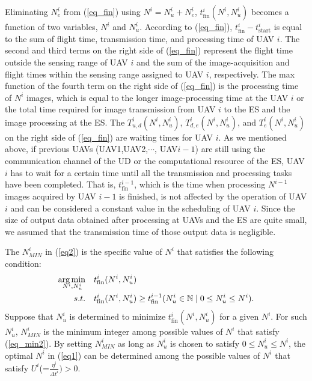 \documentclass{ieeeaccess}
\begin{document}
Eliminating $N_e^i$ from (\ref{eq_fin}) using $N^i=N_u^i+N_e^i$, $t_{\mathrm{fin}}^i(N^i,N_u^i)$ becomes a function of two variables, $N^i$ and $N_u^i$. According to (\ref{eq_fin}), $t_{\mathrm{fin}}^i-t_{\mathrm{start}}^i$ is equal to the sum of flight time, transmission time, and processing time of UAV $i$. The second and third terms on the right side of (\ref{eq_fin}) represent the flight time outside the sensing range of UAV $i$ and the sum of the image-acquisition and flight times within the sensing range assigned to UAV $i$, respectively. The max function of the fourth term on the right side of (\ref{eq_fin}) is the processing time of $N^i$ images, which is equal to the longer image-processing time at the UAV $i$ or the total time required for image transmission from UAV $i$ to the ES and the image processing at the ES. The $T_{u,d}^{i}(N^i,N_u^i)$, $T_{d,e}^{i}(N^i,N_u^i)$, and $T_e^{i}(N^i,N_u^i)$ on the right side of (\ref{eq_fin}) are waiting times for UAV $i$. As we mentioned above, if previous UAVs (UAV1,UAV2,$\cdots$, UAV${i-1}$) are still using the communication channel of the UD or the computational resource of the ES, UAV $i$ has to wait for a certain time until all the transmission and processing tasks have been completed. That is, $t_{\mathrm{fin}}^{i-1}$, which is the time when processing $N^{i-1}$ images acquired by UAV $i-1$ is finished, is not affected by the operation of UAV $i$ and can be considered a constant value in the scheduling of UAV $i$. Since the size of output data obtained after processing at UAVs and the ES are quite small, we assumed that the transmission time of those output data is negligible.

The $N_{MIN}^i$ in (\ref{eq2}) is the specific value of $N^i$ that satisfies the following condition:
%
\begin{align}
\arg \min_{\hspace{-5mm}N^i,N_u^i} \quad& {t_{\mathrm{fin}}^i(N^i,N_u^i)}\label{eq_min1}\\
s.t. \quad& {t_{\mathrm{fin}}^i(N^i,N_u^i)}\geq{t_{\mathrm{fin}}^{i-1}}({N_u^i}\in \mathbb{N}\mid 0\leq{N_u^i}\leq{N^i}). \label{eq_min2}
\end{align}
%
Suppose that ${N_u^i}$ is determined to minimize $t_{\mathrm{fin}}^i(N^i,N_u^i)$ for a given $N^i$. For such ${N_u^i}$, $N_{MIN}^i$ is the minimum integer among possible values of $N^i$ that satisfy (\ref{eq_min2}). By setting $N_{MIN}^i$ as long as ${N_u^i}$ is chosen to satisfy $0\leq{N_u^i}\leq{N^i}$, the optimal $N^i$ in (\ref{eq1}) can be determined among the possible values of $N^i$ that satisfy $U^i$(=$\frac{\eta^{i}}{{\Delta{t}}^i}) > 0$.
\end{document}
